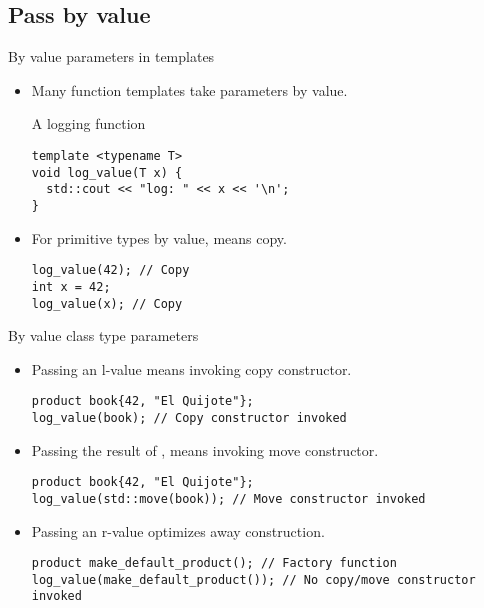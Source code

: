 \subsection{Pass by value}
\begin{frame}[t,fragile]{By value parameters in templates}
\begin{itemize}
  \item Many function templates take parameters by value.
\begin{block}{A logging function}
\begin{lstlisting}
template <typename T>
void log_value(T x) {
  std::cout << "log: " << x << '\n';
}
\end{lstlisting}
\end{block}

  \item For primitive types by value, means copy.
\begin{lstlisting}
log_value(42); // Copy
int x = 42;
log_value(x); // Copy
\end{lstlisting}
\end{itemize}
\end{frame}

\begin{frame}[t,fragile]{By value class type parameters}
\begin{itemize}
  \item Passing an l-value means invoking copy constructor.
\begin{lstlisting}
product book{42, "El Quijote"};
log_value(book); // Copy constructor invoked
\end{lstlisting}

  \item Passing the result of , means invoking move constructor.
\begin{lstlisting}
product book{42, "El Quijote"};
log_value(std::move(book)); // Move constructor invoked
\end{lstlisting}

  \item Passing an r-value optimizes away construction.
\begin{lstlisting}
product make_default_product(); // Factory function
log_value(make_default_product()); // No copy/move constructor invoked
\end{lstlisting}

\end{itemize}
\end{frame}

